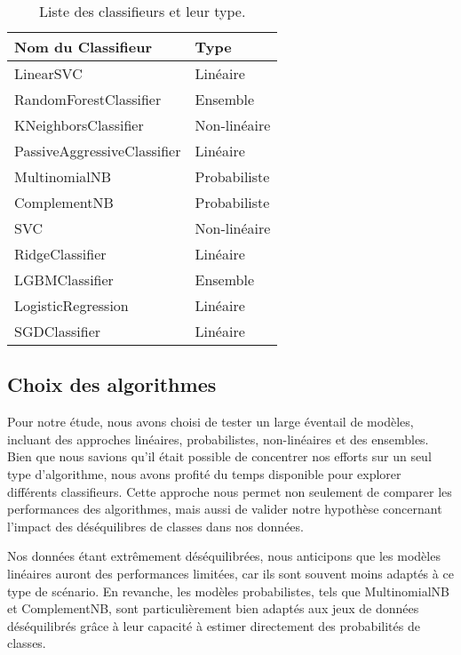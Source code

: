 \documentclass[11pt]{article}
\begin{document}
\begin{table}[h]
    \centering
    \begin{tabular}{|l|l|}
        \hline
        \textbf{Nom du Classifieur}        & \textbf{Type} \\ \hline
        LinearSVC                         & Linéaire      \\ \hline
        RandomForestClassifier            & Ensemble      \\ \hline
        KNeighborsClassifier              & Non-linéaire  \\ \hline
        PassiveAggressiveClassifier       & Linéaire      \\ \hline
        MultinomialNB                     & Probabiliste  \\ \hline
        ComplementNB                      & Probabiliste  \\ \hline
        SVC                               & Non-linéaire  \\ \hline
        RidgeClassifier                   & Linéaire      \\ \hline
        LGBMClassifier                    & Ensemble      \\ \hline
        LogisticRegression                & Linéaire      \\ \hline
        SGDClassifier                     & Linéaire      \\ \hline
    \end{tabular}
    \caption{Liste des classifieurs et leur type.}
    \label{tab:classifieurs_types} %
\end{table}

\subsection{Choix des algorithmes}
Pour notre étude, nous avons choisi de tester un large éventail de modèles, incluant des approches linéaires, probabilistes, non-linéaires et des ensembles. Bien que nous savions qu'il était possible de concentrer nos efforts sur un seul type d'algorithme, nous avons profité du temps disponible pour explorer différents classifieurs. Cette approche nous permet non seulement de comparer les performances des algorithmes, mais aussi de valider notre hypothèse concernant l'impact des déséquilibres de classes dans nos données.

Nos données étant extrêmement déséquilibrées, nous anticipons que les modèles linéaires auront des performances limitées, car ils sont souvent moins adaptés à ce type de scénario. En revanche, les modèles probabilistes, tels que MultinomialNB et ComplementNB, sont particulièrement bien adaptés aux jeux de données déséquilibrés grâce à leur capacité à estimer directement des probabilités de classes.
\end{document}
